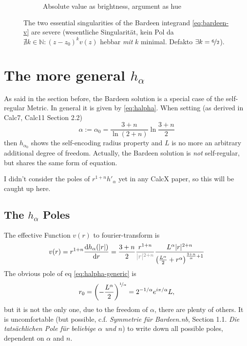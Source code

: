 \documentclass[10pt,a4paper, fleqn]{article}
\begin{document}
\begin{figure}
{\begin{subfigure}[b]{.50\linewidth}
            \caption{Absolute value as brightness, argument as hue}
        \label{fig:bardeen-2d}
    \end{subfigure}
}
    \caption{The two essential singularities of the Bardeen integrand \eqref{eq:bardeen-v} are severe (wesentliche Singularität, kein Pol da $\nexists k \in \mathbb{N}: (z-z_0)^k v(z)$ hebbar {\it mit} $k$ minimal. Defakto $\exists k = \nicefrac 62$).
    }
    \label{fig:bardeen}
\end{figure}

\newpage
\section{The more general $h_\alpha$}
As said in the section before, the Bardeen solution is a special case of the self-regular Metric. In general it is given by \eqref{eq:halpha}. When setting (as derived in Calc7, Calc11 Section 2.2)
%
\begin{equation}
\alpha := \alpha_0 = \frac{3+n}{\ln (2+n)} \ln \frac{3+n}{2}
\end{equation}
%
then $h_{\alpha_0}$ shows the self-encoding radius property and $L$ is no more an arbitrary additional degree of freedom. Actually, the Bardeen solution is {\it not} self-regular, but shares the same form of equation.

I didn't consider the poles of $r^{1+n} h'_\alpha$ yet in any CalcX paper, so this will be caught up here.

\subsection{The $h_\alpha$ Poles}
The effective Function $v(r)$ to fourier-transform is
%
\begin{equation}
v(r) = r^{1+n}  \dd{h_\alpha(|r|)}{r} =
\frac{3+n}2
\frac{r^{1+n}}{\mathcolor{gray}{|r|^{2+n}}}
\frac{ L^\alpha |r|^{2+n} }
{ \left( \frac{L^\alpha}2 + r^\alpha \right)^
{\frac{3+n}\alpha + 1}
} \label{eq:halpha-generic}
\end{equation}
%
The obvious pole of eq \eqref{eq:halpha-generic} is
%
\begin{equation}
r_0 = \left( - \frac {L^\alpha}2 \right)^{\nicefrac 1{\alpha}}
= 2^{-1/\alpha} e^{i \pi / \alpha} L,
\end{equation}
%
but it is not the only one, due to the freedom of $\alpha$, there are plenty of others. It is uncomfortable (but possible, c.f. {\it Symmetrie für Bardeen.nb}, Section 1.1. {\it Die tatsächlichen Pole für beliebige $\alpha$ und $n$}) to write down all possible poles, dependent on $\alpha$ and $n$.
\end{document}
